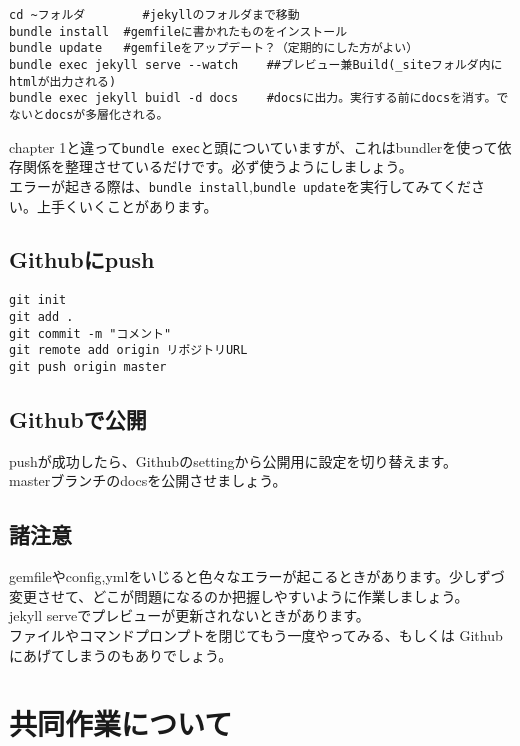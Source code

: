 \documentclass[
]{book}
\begin{document}
\begin{verbatim}
cd ~フォルダ        #jekyllのフォルダまで移動
bundle install  #gemfileに書かれたものをインストール
bundle update   #gemfileをアップデート？（定期的にした方がよい）
bundle exec jekyll serve --watch    ##プレビュー兼Build(_siteフォルダ内にhtmlが出力される)
bundle exec jekyll buidl -d docs    #docsに出力。実行する前にdocsを消す。でないとdocsが多層化される。
\end{verbatim}

chapter 1と違って\texttt{bundle\ exec}と頭についていますが、これはbundlerを使って依存関係を整理させているだけです。必ず使うようにしましょう。\\
エラーが起きる際は、\texttt{bundle\ install},\texttt{bundle\ update}を実行してみてください。上手くいくことがあります。

\hypertarget{githubux306bpush}{%
\section{Githubにpush}\label{githubux306bpush}}

\begin{verbatim}
git init
git add .
git commit -m "コメント"
git remote add origin リポジトリURL
git push origin master
\end{verbatim}

\hypertarget{githubux3067ux516cux958b-1}{%
\section{Githubで公開}\label{githubux3067ux516cux958b-1}}

pushが成功したら、Githubのsettingから公開用に設定を切り替えます。\\
masterブランチのdocsを公開させましょう。

\hypertarget{ux8af8ux6ce8ux610f}{%
\section{諸注意}\label{ux8af8ux6ce8ux610f}}

gemfileやconfig,ymlをいじると色々なエラーが起こるときがあります。少しずづ変更させて、どこが問題になるのか把握しやすいように作業しましょう。\\
jekyll serveでプレビューが更新されないときがあります。\\
ファイルやコマンドプロンプトを閉じてもう一度やってみる、もしくは Githubにあげてしまうのもありでしょう。

\hypertarget{ux5171ux540cux4f5cux696dux306bux3064ux3044ux3066}{%
\chapter{共同作業について}\label{ux5171ux540cux4f5cux696dux306bux3064ux3044ux3066}}
\end{document}
